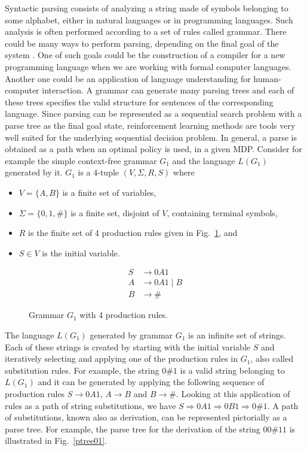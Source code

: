 \label{parsing}
Syntactic parsing consists of analyzing a string made of symbols belonging to some alphabet, either in natural languages or in programming languages. Such analysis is often performed according to a set of rules called grammar. There could be many ways to perform parsing, depending on the final goal of the system . One of such goals could be the construction of a compiler for a new programming language when we are working with formal computer languages. Another one could be an application of language understanding for human-computer interaction.
A grammar can generate many parsing trees and each of these trees specifies the valid structure for sentences of the corresponding language. Since parsing can be represented as a sequential search problem with a parse tree as the final goal state, reinforcement learning methods are tools very well suited for the underlying sequential decision problem. In general, a parse is obtained as a path when an optimal policy is used, in a given MDP.
Consider for example the simple context-free grammar $G_1$ and the language $L(G_1)$ generated by it. $G_1$ is a 4-tuple $(V, \Sigma, R, S)$ where
\begin{itemize}
 \item $V = \{ A, B\}$ is a finite set of variables,
 \item $\Sigma = \{0,1,\#\}$ is a finite set, disjoint of $V$, containing terminal symbols,
\item $R$ is the finite set of 4 production rules given in Fig.\ \ref{grammar01}, and
\item $S \in V$ is the initial variable.
\end{itemize}
\begin{figure}[h!]
 \centering
\begin{align}
 S &\rightarrow 0A1 \\
 A &\rightarrow 0A1 \; | \;  B\\
 B &\rightarrow \#
\end{align}
\caption{Grammar $G_1$ with 4 production rules.}
\label{grammar01}
\end{figure}
The language $L(G_1)$ generated by grammar $G_1$ is an infinite set of strings. Each of these strings is created by starting with the initial variable $S$ and iteratively selecting and applying one of the production rules in $G_1$, also called substitution rules. For example, the string $0\#1$ is a valid string belonging to $L(G_1)$ and it can be generated by applying the following sequence of production rules $S \rightarrow 0A1$, $A \rightarrow B$ and $B \rightarrow \#$. Looking at this application of rules as a path of string substitutions, we have $S \Rightarrow 0A1 \Rightarrow 0B1 \Rightarrow 0\#1$. A path of substitutions, known also as derivation, can be represented pictorially as a parse tree. For example, the parse tree for the derivation of the string $00\#11$ is illustrated in Fig.\ \ref{ptree01}.
